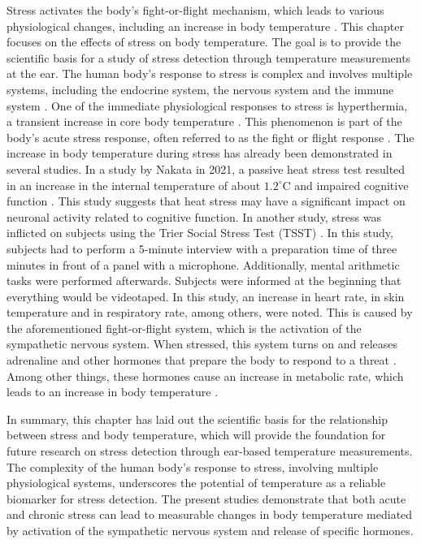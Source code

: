 Stress activates the body's fight-or-flight mechanism, which leads to various physiological changes, including an increase in body temperature \cite{marazzitiPsychologicalStressBody1992}. 
This chapter focuses on the effects of stress on body temperature. 
The goal is to provide the scientific basis for a study of stress detection through temperature measurements at the ear.
The human body's response to stress is complex and involves multiple systems, including the endocrine system, the nervous system and the immune system \cite{jamesUnderstandingRelationshipsPhysiological2023}. 
One of the immediate physiological responses to stress is hyperthermia, a transient increase in core body temperature \cite{vinkersEffectStressCore2013}. 
This phenomenon is part of the body's acute stress response, often referred to as the fight or flight response \cite{vinkersEffectStressCore2013}.
The increase in body temperature during stress has already been demonstrated in several studies.
In a study by Nakata in 2021, a passive heat stress test resulted in an increase in the internal temperature of about $1.2 ^\circ\text{C}$ and impaired cognitive function \cite{nakataEffectsPassiveHeat2021}. 
This study suggests that heat stress may have a significant impact on neuronal activity related to cognitive function.
In another study, stress was inflicted on subjects using the Trier Social Stress Test (TSST) \cite{vinkersEffectStressCore2013}. 
In this study, subjects had to perform a 5-minute interview with a preparation time of three minutes in front of a panel with a microphone. 
Additionally, mental arithmetic tasks were performed afterwards. 
Subjects were informed at the beginning that everything would be videotaped.
In this study, an increase in heart rate, in skin temperature and in respiratory rate, among others, were noted. 
This is caused by the aforementioned fight-or-flight system, which is the activation of the sympathetic nervous system. 
When stressed, this system turns on and releases adrenaline and other hormones that prepare the body to respond to a threat \cite{jeremItCoolBe2023}.
Among other things, these hormones cause an increase in metabolic rate, which leads to an increase in body temperature \cite{greaneyNeurovascularResponsesWholebody2014}.

In summary, this chapter has laid out the scientific basis for the relationship between stress and body temperature, which will provide the foundation for future research on stress detection through ear-based temperature measurements. 
The complexity of the human body's response to stress, involving multiple physiological systems, underscores the potential of temperature as a reliable biomarker for stress detection. 
The present studies demonstrate that both acute and chronic stress can lead to measurable changes in body temperature mediated by activation of the sympathetic nervous system and release of specific hormones.


